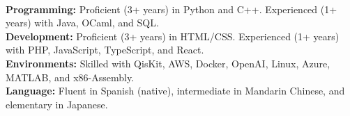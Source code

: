 \documentclass[11pt]{article}
\begin{document}
  \vspace{-8pt}\\
  \noindent\makebox[\linewidth]{\rule{7.5in}{0.3pt}}
  \noindent\textbf{Programming:} Proficient (3+ years) in Python and C++. Experienced (1+ years) with Java, OCaml, and SQL.\\
  \textbf{Development:} Proficient (3+ years) in HTML/CSS. Experienced (1+ years) with PHP, JavaScript, TypeScript, and React.\\
  \textbf{Environments:} Skilled with QisKit, AWS, Docker, OpenAI, Linux, Azure, MATLAB, and x86-Assembly.\\
  \textbf{Language:} Fluent in Spanish (native), intermediate in Mandarin Chinese, and elementary in Japanese.\\
\end{document}
